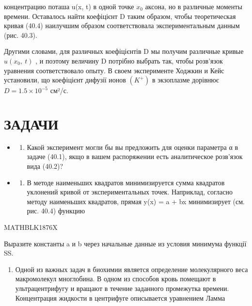 \documentclass[
  ukrainian,
]{article}
\providecommand{\tightlist}{%
  \setlength{\itemsep}{0pt}\setlength{\parskip}{0pt}}
\begin{document}
концентрацию поташа u(x, t) в одной точке \(x_0\) аксона, но в различные
моменты времени. Оставалось найти коефіцієнт D таким образом, чтобы
теоретическая кривая (40.4) наилучшим образом соответствовала
экспериментальным данным (рис. 40.3).

Другими словами, для различных коефіцієнтів D мы получим различные
кривые \(u\left(x_{0},\ t\right)\) , и поэтому величину D потрібно
выбрать так, чтобы розв'язок уравнения соответствовало опыту. В своем
эксперименте Ходжкин и Кейс установили, що коефіцієнт дифузії ионов
\((K^{+})\) в экзоплазме дорівнює \(D=1.5\times10^{-5}\) см²/с.

\section{ЗАДАЧИ}\label{ux437ux430ux434ux430ux447ux438-13}

\begin{itemize}
\tightlist
\item
  \begin{enumerate}
  \def\labelenumi{\arabic{enumi}.}
  \tightlist
  \item
    Какой эксперимент могли бы вы предложить для оценки параметра α в
    задаче (40.1), якщо в вашем распоряжении есть аналитическое
    розв'язок вида (40.2)?
  \end{enumerate}
\item
  \begin{enumerate}
  \def\labelenumi{\arabic{enumi}.}
  \setcounter{enumi}{1}
  \tightlist
  \item
    В методе наименьших квадратов минимизируется сумма квадратов
    уклонений кривой от экспериментальных точек. Наприклад, согласно
    методу наименьших квадратов, прямая y(x) = a + bx минимизирует (см.
    рис. 40.4) функцию
  \end{enumerate}
\end{itemize}

MATHBLK1876X

Выразите константы a и b через начальные данные из условия минимума
функції SS.

\begin{enumerate}
\def\labelenumi{\arabic{enumi}.}
\setcounter{enumi}{2}
\tightlist
\item
  Одной из важных задач в биохимии является определение молекулярного
  веса макромолекул многлобина. В одном из способов кровь помещают в
  ультрацентрифугу и вращают в течение заданного промежутка времени.
  Концентрация жидкости в центрифуге описывается уравнением Ламма
\end{enumerate}
\end{document}
